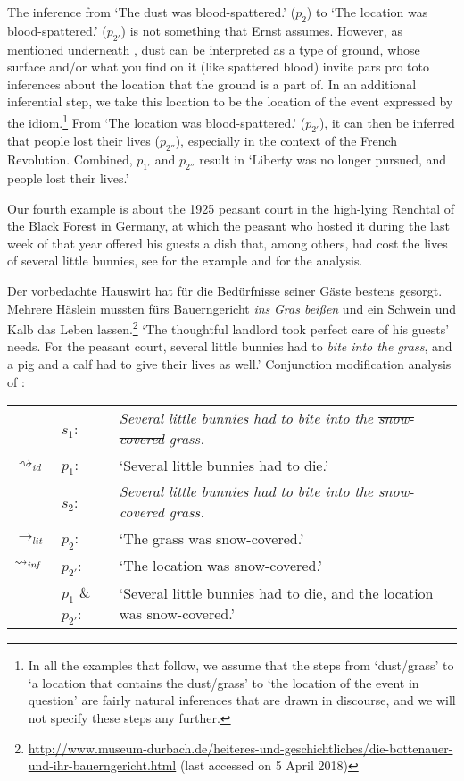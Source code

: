 \documentclass[output=paper]{langsci/langscibook}
\begin{document}
The inference from `The dust was blood-spattered.' ($p_{2}$) to `The location was blood-spattered.' ($p_{2'}$) is not something that Ernst assumes. However, as mentioned underneath , dust can be interpreted as a type of ground, whose surface and/or what you find on it (like spattered blood) invite pars pro toto inferences about the location that the ground is a part of. In an additional inferential step, we take this location to be the location of the event expressed by the idiom.\footnote{In all the examples that follow, we assume that the steps from `dust/grass' to `a location that contains the dust/grass' to `the location of the event in question' are fairly natural inferences that are drawn in discourse, and we will not specify these steps any further.\label{inferential steps}}
From `The location was blood-spattered.' ($p_{2'}$), it can then be inferred that people lost their lives ($p_{2''}$), especially in the context of the French Revolution. Combined, $p_{1'}$ and $p_{2''}$ result in `Liberty was no longer pursued, and people lost their lives.'

Our fourth example is about the 1925 peasant court in the high-lying Renchtal of the Black Forest in Germany, at which the peasant who hosted it during the last week of that year offered his guests a dish that, among others, had cost the lives of several little bunnies, see  for the example and  for the analysis.\largerpage

\ea \label{snow-covered grass} 
Der vorbedachte Hauswirt hat für die Bedürfnisse seiner Gäste bestens gesorgt. Mehrere Häslein mussten fürs Bauerngericht \textit{ins} \underline{} \textit{Gras beißen} und ein Schwein und Kalb das Leben lassen.\footnote{\url{http://www.museum-durbach.de/heiteres-und-geschichtliches/die-bottenauer-und-ihr-bauerngericht.html} (last accessed on 5 April 2018)}
\glt `The thoughtful landlord took perfect care of his guests' needs. For the peasant court, several little bunnies had to \textit{bite into the} \underline{} \textit{grass}, and a pig and a calf had to give their lives as well.'
\ex \label{analysis snow-covered grass} 
Conjunction modification analysis of :\smallskip\\
\begin{tabularx}{\linewidth}[t]{@{}llQ@{}}
& 	$s_{1}$: & \textit{Several little bunnies had to bite into the \sout{snow-covered} grass.} \\
$\rightsquigarrow_{id}$	&	$p_{1}$: & `Several little bunnies had to die.' \medskip\\
& 	$s_{2}$: & \textit{\sout{Several little bunnies had to bite into} the snow-covered grass.} \\
$\rightarrow_{lit}$ & $p_{2}$: & `The grass was snow-covered.' \\
$\rightsquigarrow_{\text{\itshape inf}}$	&	$p_{2'}$: &`The location was snow-covered.' \medskip\\
&	$p_{1}$ \& $p_{2'}$: & `Several little bunnies had to die, and the location was snow-covered.' \\
\end{tabularx}
\z
\end{document}

